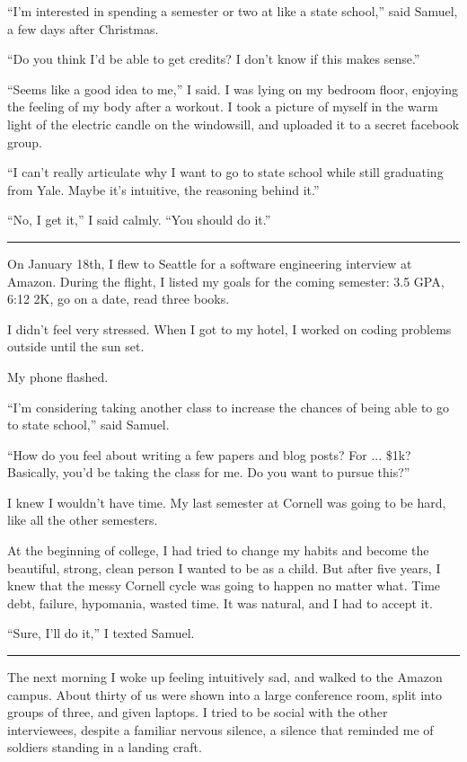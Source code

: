 ``I'm interested in spending a semester or two at like a state school,'' said
Samuel, a few days after Christmas.  

``Do you think I'd be able to get credits?  I don't know if this makes sense.''

``Seems like a good idea to me,'' I said.  I was lying on my bedroom floor,
enjoying the feeling of my body after a workout.  I took a picture of myself in
the warm light of the electric candle on the windowsill, and uploaded it to a
secret facebook group. 

``I can't really articulate why I want to go to state school while still
graduating from Yale.  Maybe it's intuitive, the reasoning behind it.'' 

``No, I get it,'' I said calmly. ``You should do it.''

\plainfancybreak{12pt}{2}{}

On January 18th, I flew to Seattle for a software engineering interview at
Amazon.  During the flight, I listed my goals for the coming semester: 3.5 GPA,
6:12 2K, go on a date, read three books.  

I didn't feel very stressed.  When I got to my hotel, I worked on coding
problems outside until the sun set.

My phone flashed.

``I'm considering taking another class to increase the chances of being able to
go to state school,'' said Samuel.  

``How do you feel about writing a few papers and blog posts?  For ... \$1k?
Basically, you'd be taking the class for me.  Do you want to pursue this?'' 

I knew I wouldn't have time.  My last semester at Cornell was going to be hard,
like all the other semesters.

At the beginning of college, I had tried to change my habits and become the
beautiful, strong, clean person I wanted to be as a child.  But after five
years, I knew that the messy Cornell cycle was going to happen no matter what.
Time debt, failure, hypomania, wasted time.  It was natural, and I had to accept
it.

``Sure, I'll do it,'' I texted Samuel.

\plainfancybreak{12pt}{2}{}

The next morning I woke up feeling intuitively sad, and walked to the Amazon
campus.  About thirty of us were shown into a large conference room, split into
groups of three, and given laptops.  I tried to be social with the other
interviewees, despite a familiar nervous silence, a silence that reminded me of
soldiers standing in a landing craft. 

